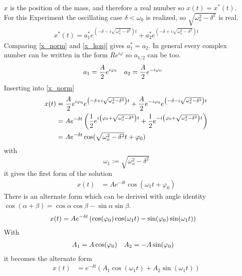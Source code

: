 \(x\) is the position of the mass, and therefore a real number so \(x(t)=x^*(t)\). For this Experiment the oscillating case \(\delta < \omega_0\) is realized, so \(\sqrt{\omega_o^2-\delta^2}\) is real.
\begin{align}
x^*(t) = a_1^*e^{\left(-\delta-i\sqrt{\omega_o^2-\delta^2} \right)t} + a_2^*e^{\left(-\delta+i\sqrt{\omega_o^2-\delta^2} \right)t}
\label{x_konj}
\end{align}
Comparing \eqref{x_norm} and \eqref{x_konj} gives \(a_1^* = a_2\). In general every complex number can be written in the form \(Re^{i\varphi}\) so \(a_{1/2}\) can be too.
\begin{align}
a_1 &= \frac{A}{2} e^{i\varphi_0} && a_2 = \frac{A}{2} e^{-i\varphi_0} \notag
\end{align}
Inserting into \eqref{x_norm}
\begin{align}
x(t) &= \frac{A}{2} e^{i\varphi_0}e^{\left(-\delta+i\sqrt{\omega_o^2-\delta^2} \right)t} + \frac{A}{2} e^{-i\varphi_0}e^{\left(-\delta-i\sqrt{\omega_o^2-\delta^2} \right)t}\notag\\
 &= Ae^{-\delta t} \left(\frac{1}{2} e^{i\left(\varphi_0+\sqrt{\omega_o^2-\delta^2}\right)t} + \frac{1}{2} e^{-i\left(\varphi_0+\sqrt{\omega_o^2-\delta^2}\right)t} \right)\notag\\
  &= Ae^{-\delta t}\cos(\sqrt{\omega_o^2-\delta^2}t + \varphi_0)\notag
\end{align}
with
\begin{equation}
\omega_1 := \sqrt{\omega_o^2-\delta^2}
\label{w1}
\end{equation}
it gives the first form of the solution
\begin{align}
x(t) &= Ae^{-\delta t}\cos(\omega_1 t + \varphi_0)\label{x(t)_1}
\end{align}
There is an alternate form which can be derived with angle identity \(\cos(\alpha + \beta) = \cos \alpha \cos \beta - \sin \alpha \sin \beta \).
\begin{align}
x(t) &= Ae^{-\delta t}\left( \cos(\varphi_0)\cos(\omega_1 t) - \sin(\varphi_0)\sin(\omega_1 t) \right) \notag
\end{align}
With
\begin{align}
A_1 &= A\cos(\varphi_0) && A_2 = -A\sin(\varphi_0) \notag
\end{align}
it becomes the alternate form
\begin{align}
x(t) &= e^{-\delta t}\left(A_1 \cos(\omega_1 t) + A_2 \sin(\omega_1 t) \right) \label{x(t)_2}
\end{align}
